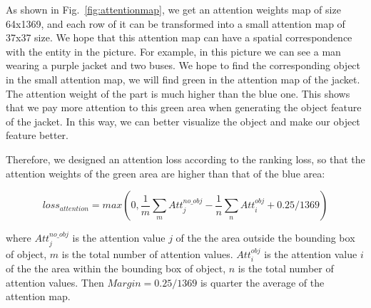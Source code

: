 As shown in Fig.~\ref{fig:attentionmap}, we get an attention weights map of size 64x1369, and each row of it can be transformed into a small attention map of 37x37 size. We hope that this attention map can have a spatial correspondence with the entity in the picture. For example, in this picture we can see a man wearing a purple jacket and two buses. We hope to find the corresponding object in the small attention map, we will find green in the attention map of the jacket. The attention weight of the part is much higher than the blue one. This shows that we pay more attention to this green area when generating the object feature of the jacket. In this way, we can better visualize the object and make our object feature better.

Therefore, we designed an attention loss according to the ranking loss, so that the attention weights of the green area are higher than that of the blue area:

\begin{equation}
	loss_{attention}=max(0, \frac{1}{m}\sum_{m}Att_j^{no\_obj}-\frac{1}{n}\sum_{n}Att_i^{obj}+0.25
	/1369)
\end{equation}

where $Att_j^{no\_obj}$ is the attention value $  j  $ of the the area outside the bounding box  of  object, $ m $ is the total number of attention values. $ Att_i^{obj} $ is the attention value $  i  $ of the the area within the bounding box  of object, $ n $ is the total number of attention values. Then $ Margin=0.25/1369  $ is quarter the average of the attention map.

